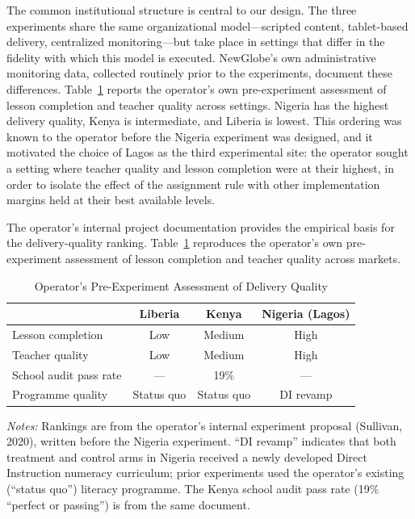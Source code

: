 \documentclass[11pt]{article}
\begin{document}
The common institutional structure is central to our design. The three experiments share the same organizational model---scripted content, tablet-based delivery, centralized monitoring---but take place in settings that differ in the fidelity with which this model is executed. NewGlobe's own administrative monitoring data, collected routinely prior to the experiments, document these differences. Table~\ref{tab:tau_summary} reports the operator's own pre-experiment assessment of lesson completion and teacher quality across settings. Nigeria has the highest delivery quality, Kenya is intermediate, and Liberia is lowest. This ordering was known to the operator before the Nigeria experiment was designed, and it motivated the choice of Lagos as the third experimental site: the operator sought a setting where teacher quality and lesson completion were at their highest, in order to isolate the effect of the assignment rule with other implementation margins held at their best available levels.

The operator's internal project documentation provides the empirical basis for the delivery-quality ranking. Table~\ref{tab:tau_summary} reproduces the operator's own pre-experiment assessment of lesson completion and teacher quality across markets.

\begin{table}[H]
\centering
\caption{Operator's Pre-Experiment Assessment of Delivery Quality}
\label{tab:tau_summary}
\begin{threeparttable}
\begin{tabular}[t]{lccc}
\toprule
 & Liberia & Kenya & Nigeria (Lagos) \\
\midrule
Lesson completion & Low & Medium & High \\
Teacher quality & Low & Medium & High \\
School audit pass rate & --- & 19\% & --- \\
Programme quality & Status quo & Status quo & DI revamp \\
\bottomrule
\end{tabular}
\begin{tablenotes}
\footnotesize
\item \textit{Notes:} Rankings are from the operator's internal experiment proposal (Sullivan, 2020), written before the Nigeria experiment. ``DI revamp'' indicates that both treatment and control arms in Nigeria received a newly developed Direct Instruction numeracy curriculum; prior experiments used the operator's existing (``status quo'') literacy programme. The Kenya school audit pass rate (19\% ``perfect or passing'') is from the same document.
\end{tablenotes}
\end{threeparttable}
\end{table}
\end{document}
